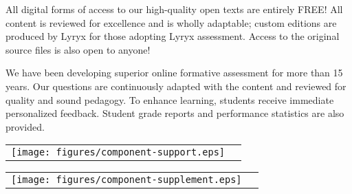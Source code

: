 \begin{center}
  \begin{multicols}{2}
    \parbox{0.9\linewidth}{
      All digital forms of access to our high-quality open texts are entirely FREE! All content is reviewed for excellence and is wholly adaptable; custom editions are produced by Lyryx for those adopting Lyryx assessment. Access to the original source files is also open to anyone!
    }

    \columnbreak

    \parbox{0.9\linewidth}{
      We have been developing superior online formative assessment for more than 15 years. Our questions are continuously adapted with the content and reviewed for quality and sound pedagogy. To enhance learning, students receive immediate personalized feedback. Student grade reports and performance statistics are also provided.
    }
  \end{multicols}
\end{center}

\vspace{2em}

\begin{multicols}{2}
  \begin{center}
    \begin{lscshdrbox}
      \begin{tabu}{X[1,c,m] X[2,l,m]}
        \vspace{0pt}
        \texttt{[image: figures/component-support.eps]}
        &
        \vspace{0pt}
        \textcolor{white}{\textbf{\fontsize{14}{20}\selectfont {SUPPORT}}}
      \end{tabu}
    \end{lscshdrbox}
  \end{center}

  \columnbreak

  \begin{center}
    \begin{lscshdrbox}
      \begin{tabu}{X[1,c,m] X[2,l,m]}
        \vspace{0pt}
        \texttt{[image: figures/component-supplement.eps]}
        &
        \vspace{0pt}
        \textcolor{white}{\textbf{\fontsize{14}{20}\selectfont {INSTRUCTOR SUPPLEMENTS}}}
      \end{tabu}
    \end{lscshdrbox}
  \end{center}
\end{multicols}



